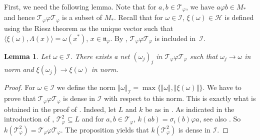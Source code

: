\documentclass[pdftex]{sigma}
\numberwithin{equation}{section}
\newtheorem{lem}[thm]{Lemma}
\theoremstyle{definition}
\newcommand{\cHil}{\mathcal{H}}
\newcommand{\nphi}{\mathfrak{n}_\varphi}
\begin{document}
First, we need the following lemma. Note that for $a, b \in \mathcal{T}_\varphi$, we have $a \varphi b \in M_\ast$ and hence $\mathcal{T}_{\varphi} \varphi \mathcal{T}_{\varphi}$ is a subset of $M_\ast$. Recall that for $\omega \in \mathcal{I}$, $\xi(\omega) \in \cHil$ is def\/ined using the Riesz theorem as the unique vector such that $\langle  \xi(\omega) , \Lambda(x)\rangle = \omega(x^\ast)$, $x \in \nphi$. By \cite[Lemma~8.5]{KusVae}, $\mathcal{T}_\varphi \varphi \mathcal{T}_\varphi$ is included in~$\mathcal{I}$.

\begin{lem}\label{LemTechLem}
Let $\omega \in \mathcal{I}$. There exists a net $(\omega_j)_j$ in $\mathcal{T}_{\varphi} \varphi \mathcal{T}_{\varphi}$ such that $\omega_j \rightarrow \omega$ in norm and $\xi(\omega_j) \rightarrow \xi(\omega)$ in norm.
\end{lem}

\begin{proof}
 For $\omega \in \mathcal{I}$ we def\/ine the norm $\Vert \omega \Vert_{\mathcal{I}} = \max \{ \Vert \omega \Vert, \Vert \xi(\omega) \Vert \}$. We have to prove that $\mathcal{T}_{\varphi} \varphi \mathcal{T}_{\varphi}$ is dense in $\mathcal{I}$ with respect to this norm. This is exactly what is obtained in the proof of  \cite[Proposition 3.4]{Cas}. Indeed, let $ L$ and $k$ be as in \cite{Cas}. As indicated in the introduction of \cite{Cas},  $\mathcal{T}_{\varphi}^2 \subseteq L$ and for $a,b \in \mathcal{T}_{\varphi}$, $k(ab) = \sigma_i(b) \varphi a$, see also \cite[Corollary 2.15]{Cas}. So $k(\mathcal{T}_{\varphi}^2 ) = \mathcal{T}_{\varphi} \varphi \mathcal{T}_{\varphi}$. The proposition yields that $k(\mathcal{T}_{\varphi}^2 )$ is dense in $\mathcal{I}$.
\end{proof}
\end{document}
